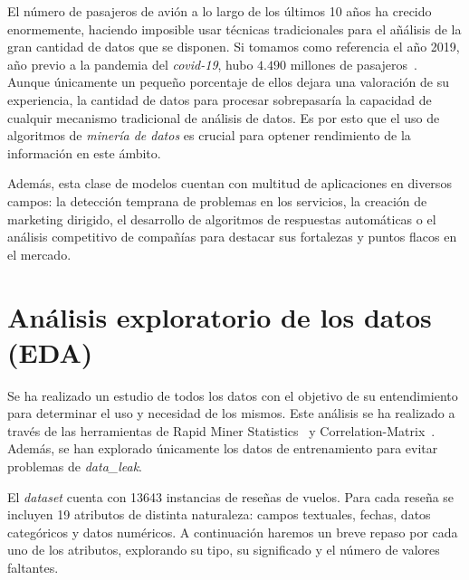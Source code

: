 \documentclass[es]{uc3mreport}
\begin{document}
\begin{report}
El número de pasajeros de avión a lo largo de los últimos 10 años ha crecido enormemente, haciendo imposible usar técnicas tradicionales para el añálisis de la gran cantidad de datos que se disponen. Si tomamos como referencia el año 2019, año previo a la pandemia del \textit{covid-19}, hubo $4.490$ millones de pasajeros~\cite{owd-passengers}. Aunque únicamente un pequeño porcentaje de ellos dejara una valoración de su experiencia, la cantidad de datos para procesar sobrepasaría la capacidad de cualquir mecanismo tradicional de análisis de datos. Es por esto que el uso de algoritmos de \textit{minería de datos} es crucial para optener rendimiento de la información en este ámbito.

Además, esta clase de modelos cuentan con multitud de aplicaciones en diversos campos: la detección temprana de problemas en los servicios, la creación de marketing dirigido, el desarrollo de algoritmos de respuestas automáticas o el análisis competitivo de compañías para destacar sus fortalezas y puntos flacos en el mercado. 

\section{Análisis exploratorio de los datos (EDA)}
\label{chap:eda}
Se ha realizado un estudio de todos los datos con el objetivo de su entendimiento para determinar el uso y necesidad de los mismos. Este análisis se ha realizado a través de las herramientas de Rapid Miner Statistics~\cite{Statistics-RM} y Correlation-Matrix~\cite{Correlation-Matrix-RM}. Además, se han explorado únicamente los datos de entrenamiento para evitar problemas de \textit{data\_leak}. 

El \textit{dataset} cuenta con 13643 instancias de reseñas de vuelos. Para cada reseña se incluyen 19 atributos de distinta naturaleza: campos textuales, fechas, datos categóricos y datos numéricos. A continuación haremos un breve repaso por cada uno de los atributos, explorando su tipo, su significado y el número de valores faltantes.


\end{report}
\end{document}
